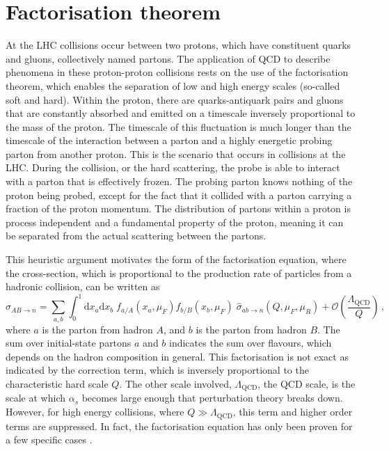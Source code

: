 \documentclass[main.tex]{subfiles}
\begin{document}
\section{Factorisation theorem}\label{sec:factorisation}
    At the LHC collisions occur between two protons,
    which have constituent quarks and gluons, collectively
    named partons.
    The application of QCD to describe phenomena
    in these proton-proton collisions rests on the use of
    the factorisation theorem, which enables the
    separation of low and high energy scales (so-called soft and hard).
    Within the proton, there are quarks-antiquark pairs
    and gluons that are constantly absorbed and
    emitted on a timescale inversely proportional
    to the mass of the proton.
    The timescale of this fluctuation is much longer
    than the timescale of the interaction between
    a parton and a highly energetic probing parton
    from another proton. This is the scenario
    that occurs in collisions at the LHC.
    During the collision, or the hard scattering,
    the probe is able to interact with a
    parton that is effectively frozen.
    The probing parton knows nothing of the
    proton being probed, except for the fact
    that it collided with a parton carrying
    a fraction of the proton momentum. The
    distribution of partons within a proton
    is process independent and a fundamental
    property of the proton, meaning it can be
    separated from the actual scattering between
    the partons.

    This heuristic argument motivates the form of
    the factorisation equation, where the cross-section,
    which is proportional to the production rate of
    particles from a hadronic collision, can be written as
    \begin{equation}\label{eqn:hadronic_cs}
        \sigma_{AB \rightarrow n} = \sum_{a, b}\int_{0}^{1} \mathrm{d}x_{a}\mathrm{d}x_{b} \; f_{a/A}(x_{a},\mu_{F})f_{b/B}(x_{b}, \mu_{F}) \; \hat{\sigma}_{ab \rightarrow n}(Q, \mu_{F}, \mu_{R}) + \mathcal{O}\left(\dfrac{\Lambda_{\mathrm{QCD}}}{Q}\right)\, ,
    \end{equation}
    where $a$ is the parton from hadron $A$,
    and $b$ is the parton from hadron $B$.
    The sum over initial-state partons $a$ and $b$
    indicates the sum over flavours, which depends
    on the hadron composition in general.
    This factorisation is not exact as indicated by the
    correction term, which is inversely proportional to the characteristic
    hard scale $Q$. The other scale involved, $\Lambda_{\mathrm{QCD}}$, the QCD scale,
    is the scale at which $\alpha_{s}$ becomes
    large enough that perturbation theory breaks down.
    However, for high energy collisions, where
    $Q \gg \Lambda_{\mathrm{QCD}}$, this term and higher order
    terms are suppressed.
    In fact, the factorisation equation has only been
    proven for a few specific cases \cite{Collins:2011zzd,Collins:1987pm,Collins:1989gx,Amoroso:2022eow}.
\end{document}
